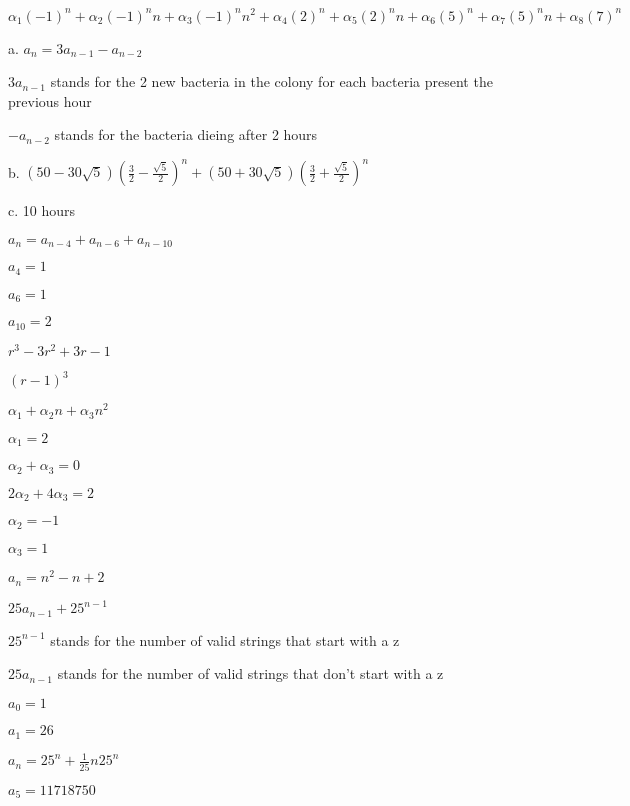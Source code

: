 \documentclass[12pt]{article}
\newenvironment{problem}[2][Problem]{\begin{trivlist}
\item[\hskip \labelsep {\bfseries #1}\hskip \labelsep {\bfseries #2.}]}{\end{trivlist}}
\begin{document}
$\alpha_1(-1)^n + \alpha_2(-1)^nn + \alpha_3(-1)^nn^2 + \alpha_4(2)^n + \alpha_5(2)^nn + \alpha_6(5)^n + \alpha_7(5)^nn + \alpha_8(7)^n$

\begin{problem}{8.supp.4 a,b,c}
\end{problem}

a. $a_n = 3a_{n-1} - a_{n-2}$

$3a_{n-1}$ stands for the 2 new bacteria in the colony for each bacteria present the previous hour

$-a_{n-2}$ stands for the bacteria dieing after 2 hours

b. $(50-30\sqrt{5})(\frac{3}{2}-\frac{\sqrt{5}}{2})^n + (50+30\sqrt{5})(\frac{3}{2}+\frac{\sqrt{5}}{2})^n$

c. 10 hours

\begin{problem}{8.supp.6}
\end{problem}

$a_n = a_{n-4} + a_{n-6} + a_{n-10}$

$a_4 = 1$

$a_6 = 1$

$a_{10} = 2$


\begin{problem}{8.supp.12}
\end{problem}

$r^3-3r^2+3r-1$

$(r-1)^3$

$\alpha_1 + \alpha_2 n + \alpha_3 n^2$

$\alpha_1 = 2$

$\alpha_2 + \alpha_3 = 0$

$2\alpha_2+4\alpha_3=2$

$\alpha_2 = -1$

$\alpha_3 = 1$

$a_n = n^2 - n + 2$

\begin{problem}{az strings}
\end{problem}

$25a_{n-1}+25^{n-1}$

$25^{n-1}$ stands for the number of valid strings that start with a z

$25a_{n-1}$ stands for the number of valid strings that don't start with a z

$a_0 = 1$

$a_1 = 26$

$a_n = 25^n + \frac{1}{25}n25^n$

$a_5 = 11718750$
\end{document}
